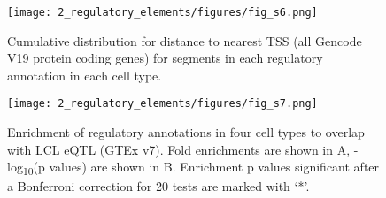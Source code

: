 \begin{figure}
    \centering
    \texttt{[image: 2\_regulatory\_elements/figures/fig\_s6.png]}
    \caption[Cumulative distribution for distance to nearest TSS (all Gencode V19 protein coding genes) for segments in each regulatory annotation in each cell type]{Cumulative distribution for distance to nearest TSS (all Gencode V19 protein coding genes) for segments in each regulatory annotation in each cell type.}
    \label{fig:c1_fs6}
\end{figure}

\begin{figure}
    \centering
    \texttt{[image: 2\_regulatory\_elements/figures/fig\_s7.png]}
    \caption[Enrichment of regulatory annotations in four cell types to overlap with LCL eQTL (GTEx v7)]{Enrichment of regulatory annotations in four cell types to overlap with LCL eQTL (GTEx v7). Fold enrichments are shown in A, -log\textsubscript{10}(p values) are shown in B. Enrichment p values significant after a Bonferroni correction for 20 tests are marked with ‘*’.}
    \label{fig:c1_fs7}
\end{figure}

